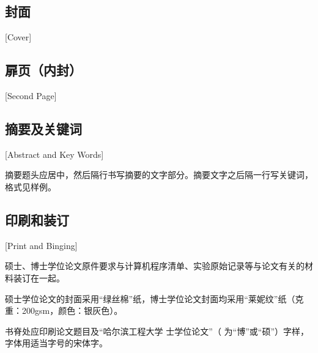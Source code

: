 \subsection{封面}[Cover]


\subsection{扉页（内封）}[Second Page]


\subsection{摘要及关键词}[Abstract and Key Words]

摘要题头应居中，然后隔行书写摘要的文字部分。摘要文字之后隔一行写关键词，格式见样例。

\subsection{印刷和装订}[Print and Binging]

硕士、博士学位论文原件要求与计算机程序清单、实验原始记录等与论文有关的材料装订在一起。

硕士学位论文的封面采用“绿丝棉”纸，博士学位论文封面均采用“莱妮纹”纸（克重：200gsm，颜色：银灰色）。

书脊处应印刷论文题目及“哈尔滨工程大学 \underline{\hspace{1em}} 士学位论文”（\underline{\hspace{1em}} 为“博”或“硕”）字样，字体用适当字号的宋体字。




